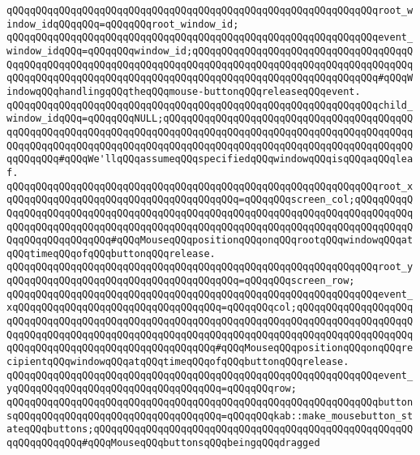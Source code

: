 \verb|qQQqqQQqqQQqqQQqqQQqqQQqqQQqqQQqqQQqqQQqqQQqqQQqqQQqqQQqqQQqqQQqroot_window_idqQQqqQQq=qQQqqQQqroot_window_id;|\newline
\verb|qQQqqQQqqQQqqQQqqQQqqQQqqQQqqQQqqQQqqQQqqQQqqQQqqQQqqQQqqQQqqQQqevent_window_idqQQq=qQQqqQQqwindow_id;qQQqqQQqqQQqqQQqqQQqqQQqqQQqqQQqqQQqqQQqqQQqqQQqqQQqqQQqqQQqqQQqqQQqqQQqqQQqqQQqqQQqqQQqqQQqqQQqqQQqqQQqqQQqqQQqqQQqqQQqqQQqqQQqqQQqqQQqqQQqqQQqqQQqqQQqqQQqqQQqqQQqqQQqqQQq#qQQqWindowqQQqhandlingqQQqtheqQQqmouse-buttonqQQqreleaseqQQqevent.|\newline
\verb|qQQqqQQqqQQqqQQqqQQqqQQqqQQqqQQqqQQqqQQqqQQqqQQqqQQqqQQqqQQqqQQqchild_window_idqQQq=qQQqqQQqNULL;qQQqqQQqqQQqqQQqqQQqqQQqqQQqqQQqqQQqqQQqqQQqqQQqqQQqqQQqqQQqqQQqqQQqqQQqqQQqqQQqqQQqqQQqqQQqqQQqqQQqqQQqqQQqqQQqqQQqqQQqqQQqqQQqqQQqqQQqqQQqqQQqqQQqqQQqqQQqqQQqqQQqqQQqqQQqqQQqqQQqqQQqqQQqqQQq#qQQqWe'llqQQqassumeqQQqspecifiedqQQqwindowqQQqisqQQqaqQQqleaf.|\newline
\verb|qQQqqQQqqQQqqQQqqQQqqQQqqQQqqQQqqQQqqQQqqQQqqQQqqQQqqQQqqQQqqQQqroot_xqQQqqQQqqQQqqQQqqQQqqQQqqQQqqQQqqQQqqQQq=qQQqqQQqscreen_col;qQQqqQQqqQQqqQQqqQQqqQQqqQQqqQQqqQQqqQQqqQQqqQQqqQQqqQQqqQQqqQQqqQQqqQQqqQQqqQQqqQQqqQQqqQQqqQQqqQQqqQQqqQQqqQQqqQQqqQQqqQQqqQQqqQQqqQQqqQQqqQQqqQQqqQQqqQQqqQQqqQQqqQQq#qQQqMouseqQQqpositionqQQqonqQQqrootqQQqwindowqQQqatqQQqtimeqQQqofqQQqbuttonqQQqrelease.|\newline
\verb|qQQqqQQqqQQqqQQqqQQqqQQqqQQqqQQqqQQqqQQqqQQqqQQqqQQqqQQqqQQqqQQqroot_yqQQqqQQqqQQqqQQqqQQqqQQqqQQqqQQqqQQqqQQq=qQQqqQQqscreen_row;|\newline
\verb|qQQqqQQqqQQqqQQqqQQqqQQqqQQqqQQqqQQqqQQqqQQqqQQqqQQqqQQqqQQqqQQqevent_xqQQqqQQqqQQqqQQqqQQqqQQqqQQqqQQqqQQq=qQQqqQQqcol;qQQqqQQqqQQqqQQqqQQqqQQqqQQqqQQqqQQqqQQqqQQqqQQqqQQqqQQqqQQqqQQqqQQqqQQqqQQqqQQqqQQqqQQqqQQqqQQqqQQqqQQqqQQqqQQqqQQqqQQqqQQqqQQqqQQqqQQqqQQqqQQqqQQqqQQqqQQqqQQqqQQqqQQqqQQqqQQqqQQqqQQqqQQqqQQqqQQq#qQQqMouseqQQqpositionqQQqonqQQqrecipientqQQqwindowqQQqatqQQqtimeqQQqofqQQqbuttonqQQqrelease.|\newline
\verb|qQQqqQQqqQQqqQQqqQQqqQQqqQQqqQQqqQQqqQQqqQQqqQQqqQQqqQQqqQQqqQQqevent_yqQQqqQQqqQQqqQQqqQQqqQQqqQQqqQQqqQQq=qQQqqQQqrow;|\newline
\verb|qQQqqQQqqQQqqQQqqQQqqQQqqQQqqQQqqQQqqQQqqQQqqQQqqQQqqQQqqQQqqQQqbuttonsqQQqqQQqqQQqqQQqqQQqqQQqqQQqqQQqqQQq=qQQqqQQqkab::make_mousebutton_stateqQQqbuttons;qQQqqQQqqQQqqQQqqQQqqQQqqQQqqQQqqQQqqQQqqQQqqQQqqQQqqQQqqQQqqQQqqQQq#qQQqMouseqQQqbuttonsqQQqbeingqQQqdragged|\newline
\newline
